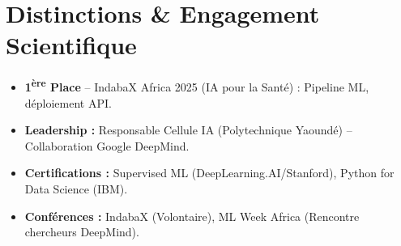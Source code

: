 \documentclass[a4paper,11pt]{article}
\begin{document}
\section{Distinctions \& Engagement Scientifique}
\begin{itemize}[leftmargin=*, nosep]
    \item \textbf{1\textsuperscript{ère} Place} -- IndabaX Africa 2025 (IA pour la Santé) : Pipeline ML, déploiement API.
    \item \textbf{Leadership :} Responsable Cellule IA (Polytechnique Yaoundé) -- Collaboration Google DeepMind.
    \item \textbf{Certifications :} Supervised ML (DeepLearning.AI/Stanford), Python for Data Science (IBM).
    \item \textbf{Conférences :} IndabaX (Volontaire), ML Week Africa (Rencontre chercheurs DeepMind).
\end{itemize}
\end{document}
